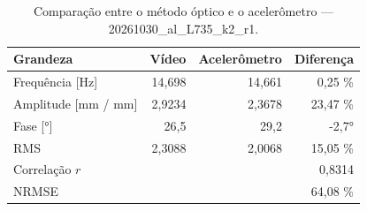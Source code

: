 \begin{table}[htbp]
  \centering
  \caption{Comparação entre o método óptico e o acelerômetro — 20261030\_al\_L735\_k2\_r1.}
  \label{tab:comp_20261030_al_L735_k2_r1}
  \begin{tabular}{lrrr}
    \toprule
    Grandeza & Vídeo & Acelerômetro & Diferença \\
    \midrule
    Frequência [Hz] & 14{,}698 & 14{,}661 & 0{,}25 \% \\
    Amplitude [mm / mm] & 2{,}9234 & 2{,}3678 & 23{,}47 \% \\
    Fase [°] & 26{,}5 & 29{,}2 & -2{,}7° \\
    RMS & 2{,}3088 & 2{,}0068 & 15{,}05 \% \\
    Correlação $r$ &  &  & 0{,}8314 \\
    NRMSE &  &  & 64{,}08 \% \\
    \bottomrule
  \end{tabular}
\end{table}
